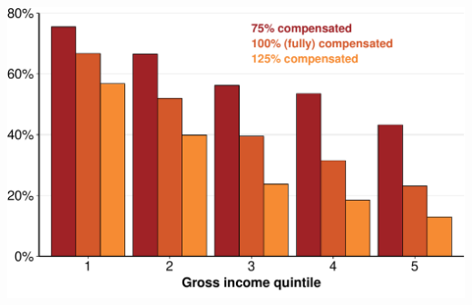 \documentclass[a4paper,landscape]{article}\usepackage[]{graphicx}\usepackage[]{color}
\newenvironment{knitrout}{}{} %
\begin{document}
\begin{knitrout}
\color{fgcolor}
\includegraphics[width=11.000in,height=7.00in]{figure/GST-Figure-9-1} 

\end{knitrout}
\end{document}

